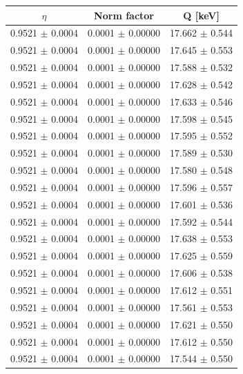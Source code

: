 \documentclass[12pt,a4paper]{article}
\theoremstyle{plain}
\begin{document}
\vspace{0.2cm}

\vspace{0.2cm}

\begin{table}[H]
	\centering
	\begin{tabular}{|c|c|c|} \hline
		$\eta$              & Norm factor          & Q [keV]            \\ \hline
		0.9521 $\pm$ 0.0004 & 0.0001 $\pm$ 0.00000 & 17.662 $\pm$ 0.544 \\ \hline
		0.9521 $\pm$ 0.0004 & 0.0001 $\pm$ 0.00000 & 17.645 $\pm$ 0.553 \\ \hline
		0.9521 $\pm$ 0.0004 & 0.0001 $\pm$ 0.00000 & 17.588 $\pm$ 0.532 \\ \hline
		0.9521 $\pm$ 0.0004 & 0.0001 $\pm$ 0.00000 & 17.628 $\pm$ 0.542 \\ \hline
		0.9521 $\pm$ 0.0004 & 0.0001 $\pm$ 0.00000 & 17.633 $\pm$ 0.546 \\ \hline
		0.9521 $\pm$ 0.0004 & 0.0001 $\pm$ 0.00000 & 17.598 $\pm$ 0.545 \\ \hline
		0.9521 $\pm$ 0.0004 & 0.0001 $\pm$ 0.00000 & 17.595 $\pm$ 0.552 \\ \hline
		0.9521 $\pm$ 0.0004 & 0.0001 $\pm$ 0.00000 & 17.589 $\pm$ 0.530 \\ \hline
		0.9521 $\pm$ 0.0004 & 0.0001 $\pm$ 0.00000 & 17.580 $\pm$ 0.548 \\ \hline
		0.9521 $\pm$ 0.0004 & 0.0001 $\pm$ 0.00000 & 17.596 $\pm$ 0.557 \\ \hline
		0.9521 $\pm$ 0.0004 & 0.0001 $\pm$ 0.00000 & 17.601 $\pm$ 0.536 \\ \hline
		0.9521 $\pm$ 0.0004 & 0.0001 $\pm$ 0.00000 & 17.592 $\pm$ 0.544 \\ \hline
		0.9521 $\pm$ 0.0004 & 0.0001 $\pm$ 0.00000 & 17.638 $\pm$ 0.553 \\ \hline
		0.9521 $\pm$ 0.0004 & 0.0001 $\pm$ 0.00000 & 17.625 $\pm$ 0.559 \\ \hline
		0.9521 $\pm$ 0.0004 & 0.0001 $\pm$ 0.00000 & 17.606 $\pm$ 0.538 \\ \hline
		0.9521 $\pm$ 0.0004 & 0.0001 $\pm$ 0.00000 & 17.612 $\pm$ 0.551 \\ \hline
		0.9521 $\pm$ 0.0004 & 0.0001 $\pm$ 0.00000 & 17.561 $\pm$ 0.553 \\ \hline
		0.9521 $\pm$ 0.0004 & 0.0001 $\pm$ 0.00000 & 17.621 $\pm$ 0.550 \\ \hline
		0.9521 $\pm$ 0.0004 & 0.0001 $\pm$ 0.00000 & 17.612 $\pm$ 0.550 \\ \hline
		0.9521 $\pm$ 0.0004 & 0.0001 $\pm$ 0.00000 & 17.544 $\pm$ 0.550 \\ \hline
	\end{tabular}
\end{table}
\end{document}
